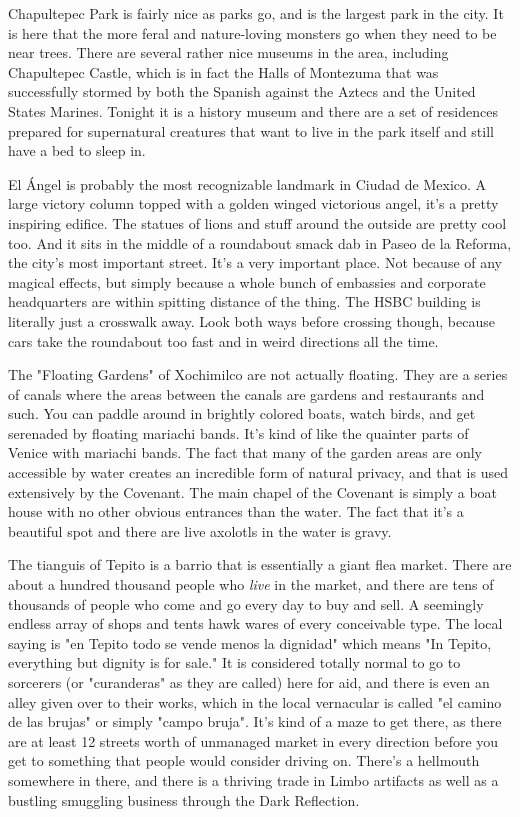Chapultepec Park is fairly nice as parks go, and is the largest park in the city. It is here that the more feral and nature-loving monsters go when they need to be near trees. There are several rather nice museums in the area, including Chapultepec Castle, which is in fact the Halls of Montezuma that was successfully stormed by both the Spanish against the Aztecs and the United States Marines. Tonight it is a history museum and there are a set of residences prepared for supernatural creatures that want to live in the park itself and still have a bed to sleep in.

El \'{A}ngel is probably the most recognizable landmark in Ciudad de Mexico. A large victory column topped with a golden winged victorious angel, it's a pretty inspiring edifice. The statues of lions and stuff around the outside are pretty cool too. And it sits in the middle of a roundabout smack dab in Paseo de la Reforma, the city's most important street. It's a very important place. Not because of any magical effects, but simply because a whole bunch of embassies and corporate headquarters are within spitting distance of the thing. The HSBC building is literally just a crosswalk away. Look both ways before crossing though, because cars take the roundabout too fast and in weird directions all the time.

The "Floating Gardens" of Xochimilco are not actually floating. They are a series of canals where the areas between the canals are gardens and restaurants and such. You can paddle around in brightly colored boats, watch birds, and get serenaded by floating mariachi bands. It's kind of like the quainter parts of Venice with mariachi bands. The fact that many of the garden areas are only accessible by water creates an incredible form of natural privacy, and that is used extensively by the Covenant. The main chapel of the Covenant is simply a boat house with no other obvious entrances than the water. The fact that it's a beautiful spot and there are live axolotls in the water is gravy.

The tianguis of Tepito is a barrio that is essentially a giant flea market. There are about a hundred thousand people who \textit{live} in the market, and there are tens of thousands of people who come and go every day to buy and sell. A seemingly endless array of shops and tents hawk wares of every conceivable type. The local saying is "en Tepito todo se vende menos la dignidad" which means "In Tepito, everything but dignity is for sale." It is considered totally normal to go to sorcerers (or "curanderas" as they are called) here for aid, and there is even an alley given over to their works, which in the local vernacular is called "el camino de las brujas" or simply "campo bruja". It's kind of a maze to get there, as there are at least 12 streets worth of unmanaged market in every direction before you get to something that people would consider driving on. There's a hellmouth somewhere in there, and there is a thriving trade in Limbo artifacts as well as a bustling smuggling business through the Dark Reflection.

